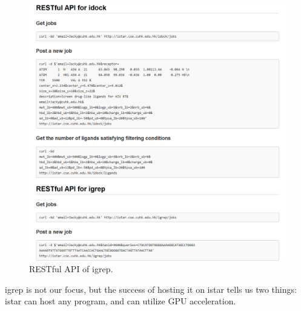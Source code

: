 \begin{figure}
\centering
\includegraphics[width=\linewidth]{istar/RESTfulAPI.png}
\caption{RESTful API of igrep.}
\label{istar:igrep-rest}
\end{figure}

igrep is not our focus, but the success of hosting it on istar tells us two things: istar can host any program, and can utilize GPU acceleration.

\chapterend
